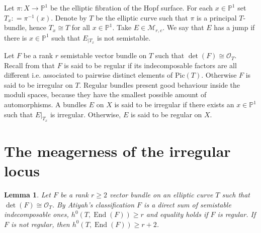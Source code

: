 \documentclass[letterpaper,10pt]{amsart}
\theoremstyle{plain}
\newtheorem{lemma}[theorem]{Lemma}
\theoremstyle{definition}
\newcommand{\enm}[1]{\ensuremath{#1}}          %
\newcommand{\op}[1]{\operatorname{#1}}
\newcommand{\cal}[1]{\mathcal{#1}}
\newcommand{\PP}{\enm{\mathbb{P}}}
\newcommand{\Mm}{\enm{\cal{M}}}
\newcommand{\Oo}{\enm{\cal{O}}}
\newcommand{\End}{\op{End}}
\newcommand{\ce}{\mathrel{\mathop:}=}
\renewcommand{\to}[1][]{\xrightarrow{\ #1\ }}
\begin{document}
Let $\pi\colon X\to \PP^1$ be the elliptic fibration of the Hopf surface. For each $x\in \PP^1$ set $T_x\ce \pi^{-1}(x)$. 
Denote by $T$ be the elliptic curve such that $\pi$ is a principal $T$-bundle, hence $T_x\cong T$ for all $x\in \PP^1$. Take $E\in \Mm_{r,c}$. We say that $E$ has a jump if there is $x\in \PP^1$ such that $E_{|T_x}$ is not semistable. 

Let $F$ be a rank $r$ semistable vector bundle on $T$ such that $\det(F)\cong \Oo_T$.
 Recall  from \cite[Def.]{FMW} that $F$ is said to be regular 
if its indecomposable factors are all different i.e. associated to pairwise distinct  elements of $\mathrm{Pic}(T)$. Otherwise $F$ is said to be irregular on $T$. Regular bundles present good behaviour inside the moduli spaces, because 
they have the smallest possible amount of automorphisms. 
A bundles $E$ on $X$ is said to be irregular if there exists an $x \in \mathbb P^1$ such that $E\vert_{T_x}$ is irregular. 
Otherwise, $E$ is said to be regular on $X$.

 
  \section*{The meagerness of the irregular locus}
 
\begin{lemma}\label{i3}
Let $F$ be a rank $r\ge 2$ vector bundle on an elliptic curve $T$ such that $\det(F)\cong \Oo_T$. By Atiyah's classification $F$ is a direct sum of semistable indecomposable ones, $h^0(T,\End(F)) \ge r$ and equality holds if  $F$ is regular. If $F$ is not regular, then $h^0(T,\End(F)) \ge r+2$.
\end{lemma}
\end{document}
